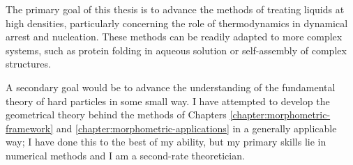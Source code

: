 \documentclass[11pt,twoside]{report}
\def\includebibliography{}
\begin{document}
The primary goal of this thesis is to advance the methods of treating liquids at high densities, particularly concerning the role of thermodynamics in dynamical arrest and nucleation.
These methods can be readily adapted to more complex systems, such as protein folding in aqueous solution or self-assembly of complex structures.

A secondary goal would be to advance the understanding of the fundamental theory of hard particles in some small way.
I have attempted to develop the geometrical theory behind the methods of Chapters \ref{chapter:morphometric-framework} and \ref{chapter:morphometric-applications} in a generally applicable way;
I have done this to the best of my ability, but my primary skills lie in numerical methods and I am a second-rate theoretician.

\ifdefined\includebibliography
  \printbibliography
\fi
  
\end{document}
